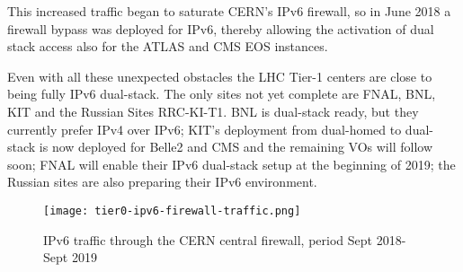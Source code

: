 This increased traffic began to saturate CERN's IPv6 firewall, so in June 2018 a
firewall bypass was deployed for IPv6,
thereby allowing the activation of dual stack access also for the ATLAS and CMS EOS instances.    
 

Even with all these unexpected obstacles the LHC Tier-1 centers are close to being fully IPv6 dual-stack. The only sites not yet complete are FNAL, BNL, KIT and the Russian Sites RRC-KI-T1. 
BNL is dual-stack ready, but they currently prefer IPv4 over IPv6; KIT's deployment from dual-homed to dual-stack is now deployed for Belle2 and CMS and the remaining VOs will follow soon; 
FNAL will enable their IPv6 dual-stack setup at the beginning of 2019; the Russian sites are also preparing their IPv6 environment.



\begin{figure}[h!]
\centering
\texttt{[image: tier0-ipv6-firewall-traffic.png]}
\caption{IPv6 traffic through the CERN central firewall, period Sept 2018-Sept 2019}
\label{fig:tier0-traffic}
\end{figure}
